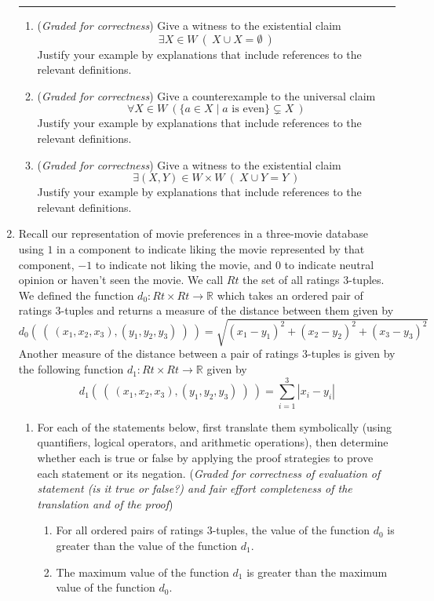 \documentclass[12pt, oneside]{article}
\begin{document}
\begin{enumerate}
   \rule{0.5\textwidth}{.4pt}
   
   
   \begin{enumerate}
   \item ({\it Graded for correctness}) Give a witness to the existential claim
   $$ \exists X \in W ~(~X \cup X = \emptyset~)$$
   Justify your example by explanations that include references to the relevant definitions.
   
   \item ({\it Graded for correctness}) Give a counterexample to the universal claim
   $$ \forall X \in W ~( \{ a \in X \mid a \textrm{ is even} \} \subsetneq X~)$$
   Justify your example by explanations 
   that include references to the relevant definitions.
   
   \item  ({\it Graded for correctness}) Give a witness to the existential claim
   $$ \exists (X,Y) \in W \times W ~(~X \cup Y = Y~)$$
   Justify your example by explanations that include references to the relevant definitions.
   \end{enumerate}
   

   \item Recall our representation of movie preferences in a three-movie database 
   using $1$ in a component to indicate liking the movie represented by that component, 
   $-1$ to indicate not liking the movie, and $0$ to indicate neutral opinion or
   haven't seen the movie. We call $Rt$ the set of all ratings $3$-tuples. 
   We defined the function 
   $d_0: Rt\times Rt \to \mathbb{R}$ which takes an ordered pair of ratings $3$-tuples and returns a measure
   of the distance between them 
   given by
   \[
   d_0 (~(~ (x_1, x_2, x_3), (y_1, y_2, y_3) ~) ~) = \sqrt{ (x_1 - y_1)^2 + (x_2 - y_2)^2 + (x_3 -y_3)^2}
   \]
   Another measure of the distance between a pair of ratings $3$-tuples is given by 
   the following function $d_1: Rt\times Rt \to \mathbb{R}$ given by 
   \[
   d_1 (~(~ (x_1, x_2, x_3), (y_1, y_2, y_3) ~) ~) = \sum_{i=1}^3 |x_i - y_i|
   \]
   \begin{enumerate}
    \item    For each of the statements below, first translate them symbolically (using
        quantifiers, logical operators, and arithmetic operations), then determine whether each 
        is true or false by applying the proof strategies to prove each statement or its negation.
        ({\it Graded for correctness of evaluation of statement (is it true or false?) and 
        fair effort completeness of the translation and of the proof}) 
        \begin{enumerate}
            \item For all ordered pairs of ratings $3$-tuples, the value of the function $d_0$ 
            is greater than the value of the function $d_1$.
            \item The maximum value of the function $d_1$ is greater than the maximum value of the function $d_0$.
        \end{enumerate}


\end{enumerate}
\end{enumerate}
\end{document}
